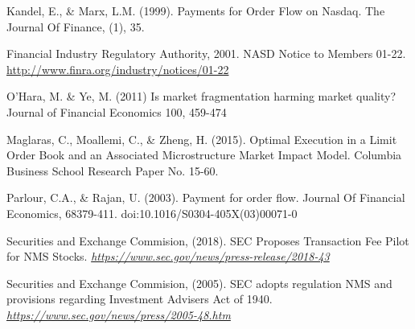 \documentclass[11pt]{beamer}
\begin{document}
\begin{frame}[allowframebreaks]
\begin{thebibliography}{1}
	Kandel, E., \&  Marx, L.M. (1999). Payments for Order Flow on Nasdaq. The Journal Of Finance, (1), 35.
	
	Financial Industry Regulatory Authority, 2001. NASD Notice to Members 01-22. \href{http://www.finra.org/industry/notices/01-22}{http://www.finra.org/industry/notices/01-22}
	
	
	
	O’Hara, M. \& Ye, M. (2011) Is market fragmentation harming market quality? Journal of
	Financial Economics 100, 459-474
	
	Maglaras, C., Moallemi, C., \& Zheng, H. (2015). Optimal Execution in a Limit Order Book and an Associated Microstructure Market Impact Model. Columbia Business School Research Paper No. 15-60. 
	
	Parlour, C.A., \& Rajan, U. (2003). Payment for order flow. Journal Of Financial Economics, 68379-411. doi:10.1016/S0304-405X(03)00071-0
	
	Securities and Exchange Commision, (2018). SEC Proposes Transaction Fee Pilot for NMS Stocks. \href{https://www.sec.gov/news/press-release/2018-43}{\textit{https://www.sec.gov/news/press-release/2018-43}}
	
	
	Securities and Exchange Commision, (2005). SEC adopts regulation NMS and provisions regarding Investment Advisers Act of 1940. \href{https://www.sec.gov/news/press/2005-48.htm}{\textit{https://www.sec.gov/news/press/2005-48.htm}}


\end{thebibliography}	


\end{frame}
\end{document}
